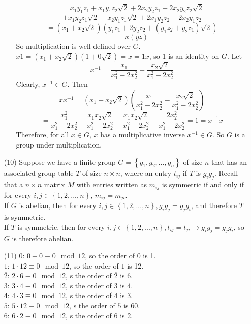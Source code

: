 \documentclass[12pt]{article}
\begin{document}
\begin{itemize}
\begin{itemize}
$$= x_1y_1z_1 + x_1y_1z_2\sqrt{2} + 2x_2y_2z_1 + 2x_2y_2z_2\sqrt{2}$$
$$+ x_1y_2z_1\sqrt{2} + x_2y_1z_1\sqrt{2} + 2x_1y_2z_2 + 2x_2y_1z_2$$
$$= (x_1 + x_2\sqrt{2})(y_1z_1 + 2y_2z_2 + (y_1z_2 + y_2z_1)\sqrt{2})$$
$$= x(yz)$$
So multiplication is well defined over $G$. $x1 = (x_1 + x_2\sqrt{2})(1 + 0\sqrt{2}) = x = 1x$, so 1 is an identity on $G$. Let 
$$x^{-1} = \frac{x_1}{x_1^2 - 2x_2^2} - \frac{x_2\sqrt{2}}{x_1^2 - 2x_2^2}$$
Clearly, $x^{-1} \in G$. Then
$$xx^{-1} = (x_1 + x_2\sqrt{2})\left(\frac{x_1}{x_1^2 - 2x_2^2} - \frac{x_2\sqrt{2}}{x_1^2 - 2x_2^2} \right)$$
$$= \frac{x_1^2}{x_1^2 - 2x_2^2} + \frac{x_1x_2\sqrt{2}}{x_1^2 - 2x_2^2} - \frac{x_1x_2\sqrt{2}}{x_1^2 - 2x_2^2} - \frac{2x_2^2}{x_1^2 - 2x_2^2} = 1 = x^{-1}x$$
Therefore, for all $x \in G$, $x$ has a multiplicative inverse $x^{-1} \in G$. So $G$ is a group under multiplication. 
\end{itemize}
\item[(10)]
Suppose we have a finite group $G = \left\lbrace g_1, g_2, ..., g_n\right\rbrace$ of size $n$ that has an associated group table $T$ of size $n \times n$, where an entry $t_{ij}$ if $T$ is $g_ig_j$. Recall that a $n \times n$ matrix $M$ with entries written as $m_{ij}$ is symmetric if and only if for every $i,j \in \left\lbrace 1, 2, ..., n \right\rbrace$, $m_{ij} = m_{ji}$. \\
If $G$ is abelian, then for every $i, j \in \left\lbrace 1, 2, ..., n \right\rbrace, g_ig_j = g_jg_i$, and therefore $T$ is symmetric. \\
If $T$ is symmetric, then for every $i, j \in \left\lbrace 1, 2, ..., n \right\rbrace, t_{ij} = t_{ji} \rightarrow g_ig_j = g_jg_i$, so $G$ is therefore abelian.
\item[(11)]
$\overline{0}$: $0 + 0 \equiv 0 \mod 12$, so the order of $\overline{0}$ is 1. \\
$\overline{1}$: $1 \cdot 12 \equiv 0 \mod 12$, so the order of $\overline{1}$ is 12. \\
$\overline{2}$: $2 \cdot 6 \equiv 0 \mod 12$, s the order of $\overline{2}$ is 6. \\
$\overline{3}$: $3 \cdot 4 \equiv 0 \mod 12$, s the order of $\overline{3}$ is 4. \\
$\overline{4}$: $4 \cdot 3 \equiv 0 \mod 12$, s the order of $\overline{4}$ is 3. \\
$\overline{5}$: $5 \cdot 12 \equiv 0 \mod 12$, s the order of $\overline{5}$ is 60. \\
$\overline{6}$: $6 \cdot 2 \equiv 0 \mod 12$, s the order of $\overline{6}$ is 2. \\

\end{itemize}
\end{document}

